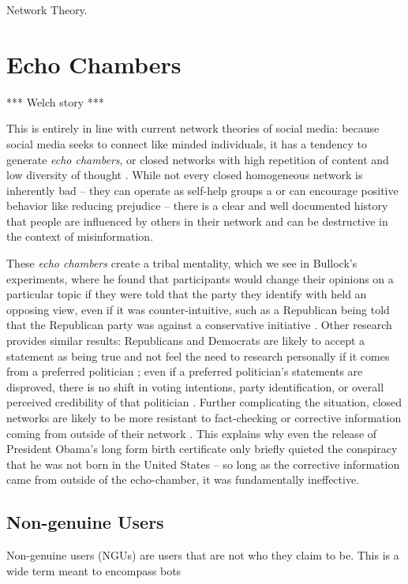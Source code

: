 Network Theory.

\section{Echo Chambers}
 *** Welch story ***
 
 This is entirely in line with current network theories of social media: because social media seeks to connect like minded individuals, it has a tendency to generate \textit{echo chambers}, or closed networks with high repetition of content and low diversity of thought \citep{adibi2005proceedings, bastian2009international, pariser2011filter,bozdag2015breaking}. While not every closed homogeneous network is inherently bad -- they can operate as self-help groups a \citep{kast2012under} or can encourage positive behavior like reducing prejudice \citep{paluck2011peer} -- there is a clear and well documented history that people are influenced by others in their network \citep{bollinger2012peer, bond201261,gerber2008social,gerber2009descriptive,meer2011brother,paluck2012salience,del2016spreading} and can be destructive in the context of misinformation.
 
 These \textit{echo chambers} create a tribal mentality, which we see in Bullock's experiments, where he found that participants would change their opinions on a particular topic if they were told that the party they identify with held an opposing view, even if it was counter-intuitive, such as a Republican being told that the Republican party was against a conservative initiative \citep{bullock2007experiments}. Other research provides similar results: Republicans and Democrats are likely to accept a statement as being true and not feel the need to research personally if it comes from a preferred politician \citep{housholder2014facebook}; even if a preferred politician's statements are disproved, there is no shift in voting intentions, party identification, or overall perceived credibility of that politician \citep{swire2017processing}. 
 Further complicating the situation, closed networks are likely to be more resistant to fact-checking or corrective information coming from outside of their network \citep{garrett2013undermining}. This explains why even the release of President Obama's long form birth certificate only briefly quieted the conspiracy that he was not born in the United States \citep{nyhan2012new} -- so long as the corrective information came from outside of the echo-chamber, it was fundamentally ineffective.
 
 \subsection{Non-genuine Users}
 Non-genuine users (NGUs) are users that are not who they claim to be. This is a wide term meant to encompass bots